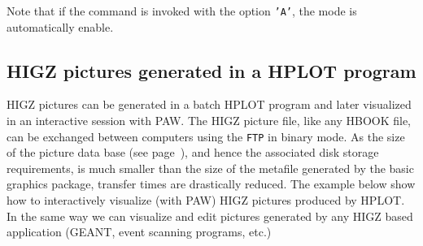 Note that if the command  is invoked with the option
\texttt{'A'}, the  mode is automatically enable.


\subsection{HIGZ pictures generated in a HPLOT program}

HIGZ pictures can be generated in a batch HPLOT program and later visualized 
in an interactive session with PAW. The HIGZ picture file, like any HBOOK file,
can be exchanged between computers using the \texttt{FTP} in binary mode. As the
size of the picture data base (see page~\pageref{sec:H2HIGZP}), and hence the
associated disk storage requirements, is much smaller than the size of the
metafile generated by the basic graphics package, transfer times are
drastically reduced. The example below show how to interactively visualize
(with PAW) HIGZ pictures produced by HPLOT. In the same way we can visualize and
edit pictures generated by any HIGZ based application (GEANT, event scanning
programs, etc.)

\medskip

